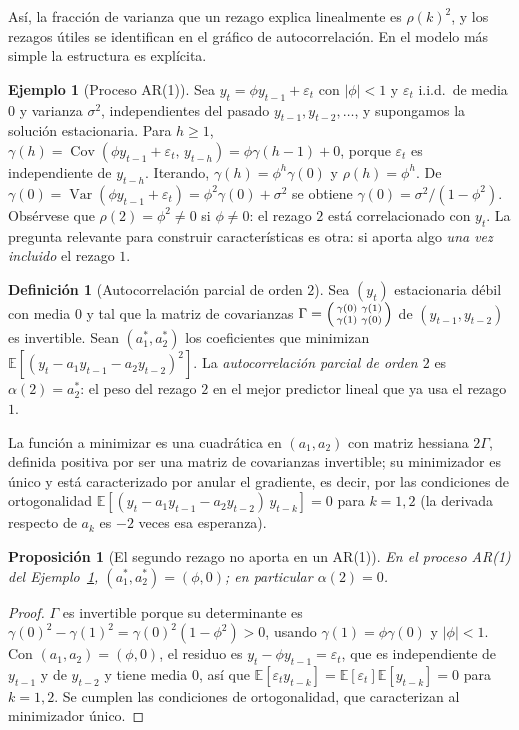 \documentclass[11pt]{article}
\newtheorem{proposicion}[teorema]{Proposición}
\theoremstyle{definition}
\newtheorem{definicion}[teorema]{Definición}
\newtheorem{ejemplo}[teorema]{Ejemplo}
\theoremstyle{remark}
\newcommand{\E}{\mathbb{E}}
\DeclareMathOperator{\Var}{Var}
\DeclareMathOperator{\Cov}{Cov}
\newcommand{\abs}[1]{\left\lvert #1\right\rvert}
\begin{document}
\noindent Así, la fracción de varianza que un rezago explica linealmente es $\rho(k)^2$, y los rezagos útiles se identifican en el gráfico de autocorrelación. En el modelo más simple la estructura es explícita.

\begin{ejemplo}[Proceso AR(1)]\label{ej:ar1}
\noindent Sea $y_t=\phi y_{t-1}+\varepsilon_t$ con $\abs\phi<1$ y $\varepsilon_t$ i.i.d.\ de media $0$ y varianza $\sigma^2$, independientes del pasado $y_{t-1},y_{t-2},\dots$, y supongamos la solución estacionaria. Para $h\ge1$, $\gamma(h)=\Cov(\phi y_{t-1}+\varepsilon_t,\,y_{t-h})=\phi\gamma(h-1)+0$, porque $\varepsilon_t$ es independiente de $y_{t-h}$. Iterando, $\gamma(h)=\phi^h\gamma(0)$ y $\rho(h)=\phi^h$. De $\gamma(0)=\Var(\phi y_{t-1}+\varepsilon_t)=\phi^2\gamma(0)+\sigma^2$ se obtiene $\gamma(0)=\sigma^2/(1-\phi^2)$. Obsérvese que $\rho(2)=\phi^2\ne0$ si $\phi\ne0$: el rezago $2$ está correlacionado con $y_t$. La pregunta relevante para construir características es otra: si aporta algo \emph{una vez incluido} el rezago $1$.
\end{ejemplo}

\begin{definicion}[Autocorrelación parcial de orden $2$]\label{def:pacf}
\noindent Sea $(y_t)$ estacionaria débil con media $0$ y tal que la matriz de covarianzas $\Gamma=\begin{psmallmatrix}\gamma(0)&\gamma(1)\\\gamma(1)&\gamma(0)\end{psmallmatrix}$ de $(y_{t-1},y_{t-2})$ es invertible. Sean $(a_1^*,a_2^*)$ los coeficientes que minimizan $\E[(y_t-a_1y_{t-1}-a_2y_{t-2})^2]$. La \emph{autocorrelación parcial de orden $2$} es $\alpha(2)=a_2^*$: el peso del rezago $2$ en el mejor predictor lineal que ya usa el rezago $1$.
\end{definicion}

\noindent La función a minimizar es una cuadrática en $(a_1,a_2)$ con matriz hessiana $2\Gamma$, definida positiva por ser una matriz de covarianzas invertible; su minimizador es único y está caracterizado por anular el gradiente, es decir, por las condiciones de ortogonalidad $\E[(y_t-a_1y_{t-1}-a_2y_{t-2})\,y_{t-k}]=0$ para $k=1,2$ (la derivada respecto de $a_k$ es $-2$ veces esa esperanza).

\begin{proposicion}[El segundo rezago no aporta en un AR(1)]\label{prop:pacf-ar1}
\noindent En el proceso AR(1) del Ejemplo~\ref{ej:ar1}, $(a_1^*,a_2^*)=(\phi,0)$; en particular $\alpha(2)=0$.
\end{proposicion}
\begin{proof}
\noindent $\Gamma$ es invertible porque su determinante es $\gamma(0)^2-\gamma(1)^2=\gamma(0)^2(1-\phi^2)>0$, usando $\gamma(1)=\phi\gamma(0)$ y $\abs\phi<1$. Con $(a_1,a_2)=(\phi,0)$, el residuo es $y_t-\phi y_{t-1}=\varepsilon_t$, que es independiente de $y_{t-1}$ y de $y_{t-2}$ y tiene media $0$, así que $\E[\varepsilon_ty_{t-k}]=\E[\varepsilon_t]\E[y_{t-k}]=0$ para $k=1,2$. Se cumplen las condiciones de ortogonalidad, que caracterizan al minimizador único.
\end{proof}
\end{document}
